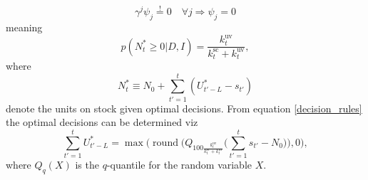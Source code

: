 \begin{equation}
	\gamma^{j}\psi_j\overset{!}{=} 0\quad \forall j \Rightarrow \psi_j=0
\end{equation}
meaning
\begin{equation}
	p(N_t^*\geq 0|D,I)=\frac{k_{t}^\text{uv}}{k^\text{sc}_{t}+k_{t}^\text{uv}},
	\label{decision_rules}
\end{equation}
where
\begin{equation}
	N_t^*\equiv N_0+\sum_{t'=1}^{t}(U_{t'-L}^*-s_{t'})
\end{equation}
denote the units on stock given optimal decisions. From equation \eqref{decision_rules} the optimal decisions can be determined viz
\begin{equation}
	\sum_{t'=1}^{t}U_{t'-L}^* = \max\bigg(\operatorname{round}\bigg(Q_{100\frac{k_{t}^\text{uv}}{k^\text{sc}_{t}+k_{t}^\text{uv}}}\bigg(\sum_{t'=1}^{t}s_{t'}-N_0\bigg)\bigg),0\bigg),
\end{equation}
where $Q_q(X)$ is the $q$-quantile for the random variable $X$.